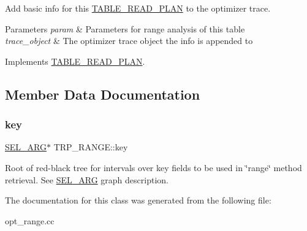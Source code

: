 Add basic info for this \mbox{\hyperlink{classTABLE__READ__PLAN}{T\+A\+B\+L\+E\+\_\+\+R\+E\+A\+D\+\_\+\+P\+L\+AN}} to the optimizer trace.


\begin{DoxyParams}{Parameters}
{\em param} & Parameters for range analysis of this table \\
\hline
{\em trace\+\_\+object} & The optimizer trace object the info is appended to \\
\hline
\end{DoxyParams}


Implements \mbox{\hyperlink{classTABLE__READ__PLAN_a35e1758c9edce0c8bea19a602409f861}{T\+A\+B\+L\+E\+\_\+\+R\+E\+A\+D\+\_\+\+P\+L\+AN}}.



\subsection{Member Data Documentation}
\mbox{\label{classTRP__RANGE_a65c1c3bff624f212e4479b6a632f7834}} 
\subsubsection{\texorpdfstring{key}{key}}
{\footnotesize\ttfamily \mbox{\hyperlink{classSEL__ARG}{S\+E\+L\+\_\+\+A\+RG}}$\ast$ T\+R\+P\+\_\+\+R\+A\+N\+G\+E\+::key}

Root of red-\/black tree for intervals over key fields to be used in \char`\"{}range\char`\"{} method retrieval. See \mbox{\hyperlink{classSEL__ARG}{S\+E\+L\+\_\+\+A\+RG}} graph description. 

The documentation for this class was generated from the following file\+:\begin{DoxyCompactItemize}
\item 
opt\+\_\+range.\+cc\end{DoxyCompactItemize}
